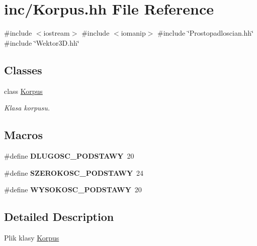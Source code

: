 \hypertarget{_korpus_8hh}{}\section{inc/\+Korpus.hh File Reference}
\label{_korpus_8hh}
{\ttfamily \#include $<$iostream$>$}\newline
{\ttfamily \#include $<$iomanip$>$}\newline
{\ttfamily \#include \char`\"{}Prostopadloscian.\+hh\char`\"{}}\newline
{\ttfamily \#include \char`\"{}Wektor3\+D.\+hh\char`\"{}}\newline
\subsection*{Classes}
\begin{DoxyCompactItemize}
\item 
class \mbox{\hyperlink{class_korpus}{Korpus}}
\begin{DoxyCompactList}\small\item\em Klasa korpusu. \end{DoxyCompactList}\end{DoxyCompactItemize}
\subsection*{Macros}
\begin{DoxyCompactItemize}
\item 
\mbox{\label{_korpus_8hh_a3144a1d41294148195215d1cc45a9ff8}} 
\#define {\bfseries D\+L\+U\+G\+O\+S\+C\+\_\+\+P\+O\+D\+S\+T\+A\+WY}~20
\item 
\mbox{\label{_korpus_8hh_af9ee9be62db81a8ff46197b166c393c6}} 
\#define {\bfseries S\+Z\+E\+R\+O\+K\+O\+S\+C\+\_\+\+P\+O\+D\+S\+T\+A\+WY}~24
\item 
\mbox{\label{_korpus_8hh_a5375f9a421a3842957aadb5e286b6954}} 
\#define {\bfseries W\+Y\+S\+O\+K\+O\+S\+C\+\_\+\+P\+O\+D\+S\+T\+A\+WY}~20
\end{DoxyCompactItemize}


\subsection{Detailed Description}
Plik klasy \mbox{\hyperlink{class_korpus}{Korpus}} 